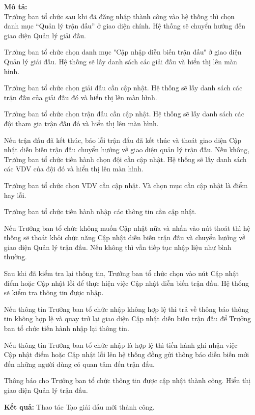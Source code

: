\noindent
\textbf{Mô tả:}\\
Trưởng ban tổ chức sau khi đã đăng nhập thành công vào hệ thống thì chọn danh mục “Quản lý trận đấu” ở giao diện chính. Hệ thống sẽ chuyển hướng đến giao diện Quản lý giải đấu. \par
Trưởng ban tổ chức chọn danh mục "Cập nhập diễn biến trận đấu" ở giao diện Quản lý giải đấu. Hệ thống sẽ lấy danh sách các giải đấu và hiển thị lên màn hình. \par
Trưởng ban tổ chức chọn giải đấu cần cập nhật. Hệ thống sẽ lấy danh sách các trận đấu của giải đấu đó và hiển thị lên màn hình. \par
Trưởng ban tổ chức chọn trận đấu cần cập nhật. Hệ thống sẽ lấy danh sách các đội tham gia trận đấu đó và hiển thị lên màn hình. \par
Nếu trận đấu đã kết thúc, báo lỗi trận đấu đã kết thúc và thoát giao diện Cập nhật diễn biến trận đấu chuyển hướng về giao diện quản lý trận đấu. Nếu không, Trưởng ban tổ chức tiến hành chọn đội cần cập nhật. Hệ thống sẽ lấy danh sách các VDV của đội đó và hiển thị lên màn hình. \par
Trưởng ban tổ chức chọn VDV cần cập nhật. Và chọn mục cần cập nhật là điểm hay lỗi. \par
Trưởng ban tổ chức tiến hành nhập các thông tin cần cập nhật. \par
Nếu Trưởng ban tổ chức không muốn Cập nhật nữa và nhấn vào nút thoát thì hệ thống sẽ thoát khỏi chức năng Cập nhật diễn biến trận đấu và chuyển hướng về giao diện Quản lý trận đấu. Nếu không thì vẫn tiếp tục nhập liệu như bình thường. \par
Sau khi đã kiểm tra lại thông tin, Trưởng ban tổ chức chọn vào nút Cập nhật điểm hoặc Cập nhật lỗi để thực hiện việc Cập nhật diễn biến trận đấu. Hệ thống sẽ kiểm tra thông tin được nhập. \par
Nếu thông tin Trưởng ban tổ chức nhập không hợp lệ thì trả về thông báo thông tin không hợp lệ và quay trở lại giao diện Cập nhật diễn biến trận đấu để Trưởng ban tổ chức tiến hành nhập lại thông tin. \par
Nếu thông tin Trưởng ban tổ chức nhập là hợp lệ thì tiến hành ghi nhận việc Cập nhật điểm hoặc Cập nhật lỗi lên hệ thống đồng gửi thông báo diễn biến mới đến những người dùng có quan tâm đến trận đấu. \par
Thông báo cho Trưởng ban tổ chức thông tin được cập nhật thành công. Hiển thị giao diện Quản lý trận đấu.

\noindent
\textbf{Kết quả:} Thao tác Tạo giải đấu mới thành công.


